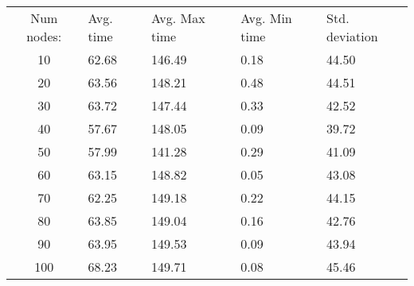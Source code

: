 \begin{tabular}{cllll}
Num nodes: & Avg. time & Avg. Max time & Avg. Min time & Std. deviation \\
10       & 62.68        & 146.49            & 0.18 & 44.50 \\
20       & 63.56        & 148.21            & 0.48 & 44.51 \\
30       & 63.72        & 147.44            & 0.33 & 42.52 \\
40       & 57.67        & 148.05            & 0.09 & 39.72 \\
50       & 57.99        & 141.28            & 0.29 & 41.09 \\
60       & 63.15        & 148.82            & 0.05 & 43.08 \\
70       & 62.25        & 149.18            & 0.22 & 44.15 \\
80       & 63.85        & 149.04            & 0.16 & 42.76 \\
90       & 63.95        & 149.53            & 0.09 & 43.94 \\
100       & 68.23        & 149.71            & 0.08 & 45.46 \\
\end{tabular}